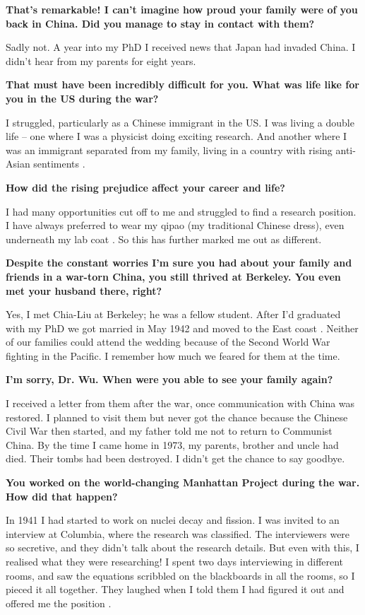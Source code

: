 \documentclass{article}
\newcommand{\q}[1]{\vspace{10pt}
\textbf{#1}}
\begin{document}
\begin{multicols}{2}
\q{That’s remarkable! I can’t imagine how proud your family were of you back in China. Did you manage to stay in contact with them?}

Sadly not. A year into my PhD I received news that Japan had invaded China. I didn’t hear from my parents for eight years.

\q{That must have been incredibly difficult for you. What was life like for you in the US during the war?}

I struggled, particularly as a Chinese immigrant in the US. I was living a double life – one where I was a physicist doing exciting research. And another where I was an immigrant separated from my family, living in a country with rising anti-Asian sentiments \cite{N2}.

\q{How did the rising prejudice affect your career and life?}

I had many opportunities cut off to me and struggled to find a research position. I have always preferred to wear my qipao (my traditional Chinese dress), even underneath my lab coat \cite{N3}. So this has further marked me out as different.

\q{Despite the constant worries I’m sure you had about your family and friends in a war-torn China, you still thrived at Berkeley. You even met your husband there, right?}

Yes, I met Chia-Liu at Berkeley; he was a fellow student. After I’d graduated with my PhD we got married in May 1942 and moved to the East coast \cite{Nbroken}. Neither of our families could attend the wedding because of the Second World War fighting in the Pacific. I remember how much we feared for them at the time.

\q{I’m sorry, Dr. Wu. When were you able to see your family again?}

I received a letter from them after the war, once communication with China was restored. I planned to visit them but never got the chance because the Chinese Civil War then started, and my father told me not to return to Communist China. By the time I came home in 1973, my parents, brother and uncle had died. Their tombs had been destroyed. I didn't get the chance to say goodbye.

\q{You worked on the world-changing Manhattan Project during the war. How did that happen?}

In 1941 I had started to work on nuclei decay and fission. I was invited to an interview at Columbia, where the research was classified. The interviewers were so secretive, and they didn’t talk about the research details. But even with this, I realised what they were researching! I spent two days interviewing in different rooms, and saw the equations scribbled on the blackboards in all the rooms, so I pieced it all together. They laughed when I told them I had figured it out and offered me the position \cite{N4}.


\end{multicols}
\end{document}
